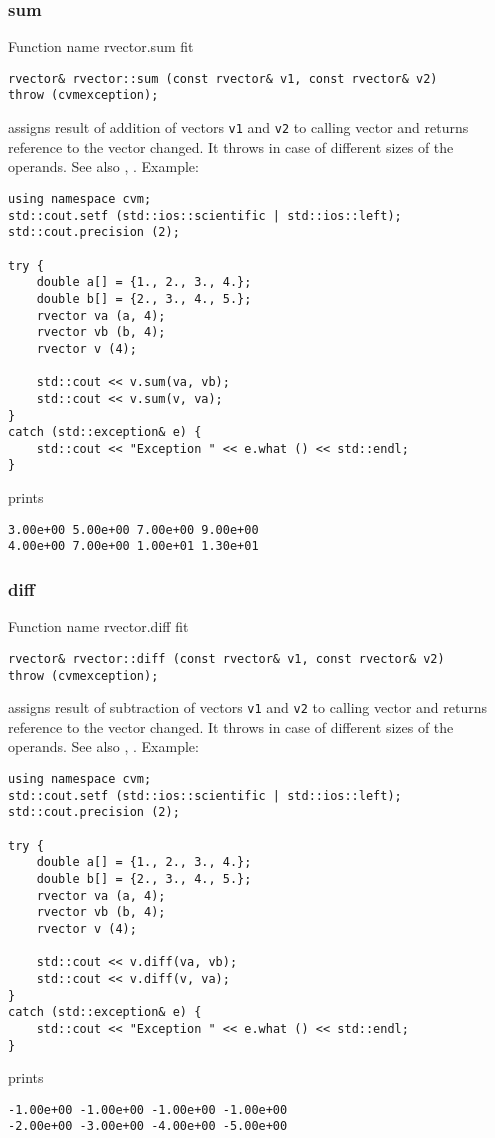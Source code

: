 \subsubsection{sum}
Function%
\pdfdest name {rvector.sum} fit
\begin{verbatim}
rvector& rvector::sum (const rvector& v1, const rvector& v2)
throw (cvmexception);
\end{verbatim}
assigns  result of addition of
vectors \verb"v1" and \verb"v2"  to  calling vector
and returns  reference to
the vector changed.
It throws  
in case of different sizes of the operands.
See also ,
.
Example:
\begin{Verbatim}
using namespace cvm;
std::cout.setf (std::ios::scientific | std::ios::left); 
std::cout.precision (2);

try {
    double a[] = {1., 2., 3., 4.};
    double b[] = {2., 3., 4., 5.};
    rvector va (a, 4);
    rvector vb (b, 4);
    rvector v (4);

    std::cout << v.sum(va, vb);
    std::cout << v.sum(v, va);
}
catch (std::exception& e) {
    std::cout << "Exception " << e.what () << std::endl;
}
\end{Verbatim}
prints
\begin{Verbatim}
3.00e+00 5.00e+00 7.00e+00 9.00e+00
4.00e+00 7.00e+00 1.00e+01 1.30e+01
\end{Verbatim}
\newpage


\subsubsection{diff}
Function%
\pdfdest name {rvector.diff} fit
\begin{verbatim}
rvector& rvector::diff (const rvector& v1, const rvector& v2)
throw (cvmexception);
\end{verbatim}
assigns  result of subtraction of
vectors \verb"v1" and \verb"v2" to  calling vector
and returns  reference to
the vector changed.
It throws  
in case of different sizes of the operands.
See also ,
.
Example:
\begin{Verbatim}
using namespace cvm;
std::cout.setf (std::ios::scientific | std::ios::left); 
std::cout.precision (2);

try {
    double a[] = {1., 2., 3., 4.};
    double b[] = {2., 3., 4., 5.};
    rvector va (a, 4);
    rvector vb (b, 4);
    rvector v (4);

    std::cout << v.diff(va, vb);
    std::cout << v.diff(v, va);
}
catch (std::exception& e) {
    std::cout << "Exception " << e.what () << std::endl;
}
\end{Verbatim}
prints
\begin{Verbatim}
-1.00e+00 -1.00e+00 -1.00e+00 -1.00e+00
-2.00e+00 -3.00e+00 -4.00e+00 -5.00e+00
\end{Verbatim}
\newpage



